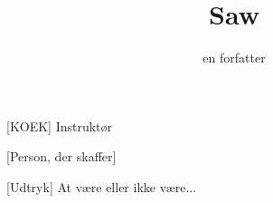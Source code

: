 \documentclass[a4paper,11pt]{article}
\title{Saw}
\author{en forfatter}
\begin{document}
\maketitle

\begin{roles}
[KOEK] Instruktør
\end{roles}

\begin{props}
[Person, der skaffer]
\end{props}


\begin{sketch}


[Udtryk] At være eller ikke være... 



\end{sketch}
\end{document}
